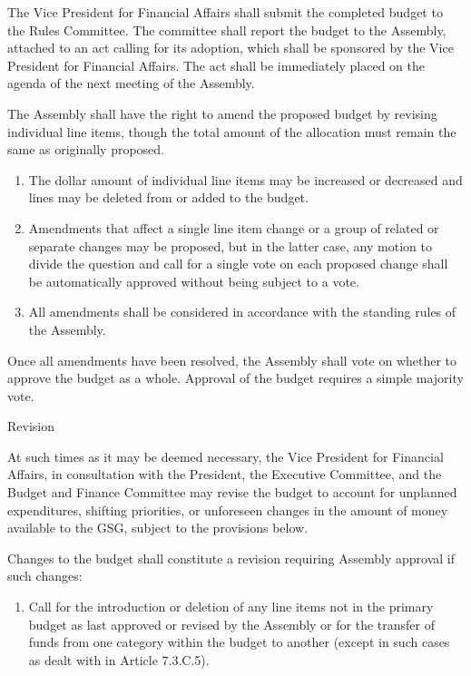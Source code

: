 \begin{bylaws-number}
\begin{bylaws-number}
    \item The Vice President for Financial Affairs shall submit the completed budget to the Rules Committee. The committee shall report the budget to the Assembly, attached to an act calling for its adoption, which shall be sponsored by the Vice President for Financial Affairs. The act shall be immediately placed on the agenda of the next meeting of the Assembly.
    \item The Assembly shall have the right to amend the proposed budget by revising individual line items, though the total amount of the allocation must remain the same as originally proposed.
    \begin{enumerate}[i]
      \item The dollar amount of individual line items may be increased or decreased and lines may be deleted from or added to the budget.
      \item Amendments that affect a single line item change or a group of related or separate changes may be proposed, but in the latter case, any motion to divide the question and call for a single vote on each proposed change shall be automatically approved without being subject to a vote.
      \item All amendments shall be considered in accordance with the standing rules of the Assembly.
    \end{enumerate}
    \item Once all amendments have been resolved, the Assembly shall vote on whether to approve the budget as a whole. Approval of the budget requires a simple majority vote.
  \end{bylaws-number}
  \item Revision
  \begin{bylaws-number}
    \item At such times as it may be deemed necessary, the Vice President for Financial Affairs, in consultation with the President, the Executive Committee, and the Budget and Finance Committee may revise the budget to account for unplanned expenditures, shifting priorities, or unforeseen changes in the amount of money available to the GSG, subject to the provisions below.
    \item Changes to the budget shall constitute a revision requiring Assembly approval if such changes:
    \begin{enumerate}[i]
      \item Call for the introduction or deletion of any line items not in the primary budget as last approved or revised by the Assembly or for the transfer of funds from one category within the budget to another (except in such cases as dealt with in Article 7.3.C.5).

\end{enumerate}
\end{bylaws-number}
\end{bylaws-number}
